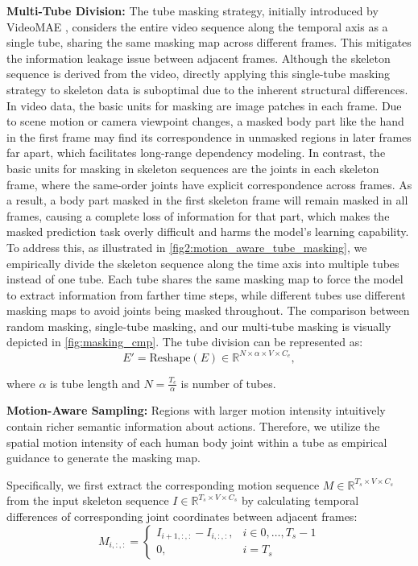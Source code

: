 \noindent \textbf{Multi-Tube Division:}
The tube masking strategy, initially introduced by VideoMAE \cite{tong2022videomae},
considers the entire video sequence along the temporal axis as a single tube,
sharing the same masking map across different frames. This mitigates the information
leakage issue between adjacent frames.
Although the skeleton sequence is derived from the
video, directly applying this single-tube
masking strategy to skeleton data is suboptimal due to the inherent structural differences.
In video data, the basic units for masking are image patches in each frame. Due to scene
motion or camera viewpoint changes, a masked body part like the hand in the first frame
may find its correspondence in unmasked regions in later frames far apart, which facilitates
long-range dependency modeling.
In contrast, the basic units for masking in skeleton sequences
are the joints in each skeleton frame, where the same-order joints have explicit correspondence
across frames. As a result, a body part masked in the first skeleton frame will remain
masked in all frames, causing a complete loss of information for that part, which makes
the masked prediction task overly difficult and harms the model's learning capability.
To address this, as illustrated in \cref{fig2:motion_aware_tube_masking},
we empirically divide the skeleton sequence along the time axis into multiple tubes
instead of one tube. Each tube shares the same masking map to force the model to extract
information from farther time steps, while different tubes use different masking maps
to avoid joints being masked throughout.
The comparison between random masking, single-tube masking, and our
multi-tube masking is visually depicted in \cref{fig:masking_cmp}.
The tube division can be represented as:
\begin{equation}
    \label{eq:deviding_tubes}
    E'=\text{Reshape}(E) \in \mathbb{R}^{N \times \alpha \times V \times C_{e}}, 
\end{equation}

\noindent where $\alpha$ is tube length and $N=\frac{T_{e}}{\alpha}$ is number of tubes.

\noindent \textbf{Motion-Aware Sampling:}
Regions with larger motion intensity intuitively contain richer semantic information
about actions. Therefore, we utilize the spatial motion intensity of each human body
joint within a tube as empirical guidance to generate the masking map.

Specifically, we first extract the corresponding motion sequence
$M \in \mathbb{R}^{T_{s} \times V \times C_{s}}$ from the input skeleton sequence
$I \in \mathbb{R}^{T_{s} \times V \times C_{s}}$ by calculating temporal differences
of corresponding joint coordinates between adjacent frames:
\begin{equation}
    \label{eq:motion}
    M_{i,:,:} = \begin{cases} 
    I_{i+1,:,:}-I_{i,:,:}, & i \in 0, \dots, T_{s}-1\\
    0, & i=T_{s}  
\end{cases}
\end{equation}

